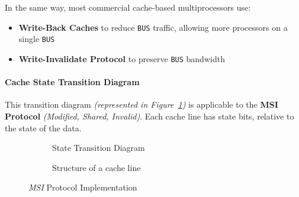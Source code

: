 \documentclass[english]{article}
\begin{document}
In the same way, most commercial cache-based multiprocessors use:

\begin{itemize}
  \item \textbf{Write-Back Caches} to reduce \texttt{BUS} traffic, allowing more processors on a single \texttt{BUS}
  \item \textbf{Write-Invalidate Protocol} to preserve \texttt{BUS} bandwidth
\end{itemize}

\paragraph{Cache State Transition Diagram}

This transition diagram \textit{(represented in Figure~\ref{subfig:MSI-state-transition-diagram})} is applicable to the \textbf{MSI Protocol} \textit{(Modified, Shared, Invalid)}.
Each cache line has state bits, relative to the state of the data.

\begin{figure}[htbp]
  \bigskip
  \centering
  \begin{subfigure}[]{\textwidth}
    \centering

    \caption{State Transition Diagram}
    \label{subfig:MSI-state-transition-diagram}
    \bigskip
  \end{subfigure}
  \begin{subfigure}[]{\textwidth}
    \centering
    \caption{Structure of a cache line}
    \label{subfig:MSI-cache-line}
  \end{subfigure}
  \caption{\textit{MSI} Protocol Implementation}
  \label{fig:MSI-protocol}
\end{figure}
\end{document}
